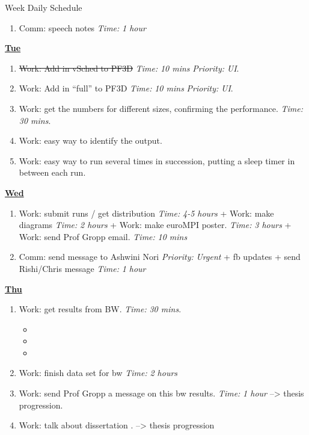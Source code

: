 \documentclass[serif, mathserif, final]{beamer}
\newcommand{\doneTask}[1]{\item \sout{#1}}
\newcommand{\timeEst}[1]{\textit{Time:} \textit{#1}}
\newcommand{\priority}[1]{\textit{Priority:} \textit{#1}}
\begin{document}
\begin{frame}{}
\begin{columns}
\begin{column}{0.50\linewidth}
\begin{block}{Week Daily Schedule}
\begin{enumerate}
\item \tiny Comm: speech notes \timeEst{1 hour} 
\end{enumerate} 

\textbf{\small \underline{Tue}}
\begin{enumerate} 
\tiny \doneTask{Work: Add in vSched to PF3D} \timeEst{10 mins} \priority{UI}.  
\item \tiny Work: Add in ``full'' to PF3D \timeEst{10 mins} \priority{UI}. 

\item \tiny Work: get the numbers for different sizes, confirming the performance. \timeEst{30 mins}.  
\item \tiny Work: easy way to identify the output. 
\item \tiny Work: easy way to run several times in succession, putting a sleep timer in between each run. 
\end{enumerate} 

\textbf{\small {\underline{Wed}}}
\begin{enumerate} 
\item \tiny Work: submit runs / get distribution \timeEst{4-5 hours}  + Work: make diagrams \timeEst{2 hours}   + Work: make euroMPI poster. \timeEst{3 hours} + Work: send Prof Gropp email. \timeEst{10 mins} 

\tiny \item \tiny Comm: send message to Ashwini Nori \priority{Urgent}  + fb updates + send Rishi/Chris message  \timeEst{1 hour} 
\end{enumerate} 

\textbf{\small{\underline{Thu}}}
\begin{enumerate} 

\item \tiny Work: get results from BW. \timeEst{30 mins}. 
\begin{itemize}
\item \tiny 
\item \tiny 
\item \tiny 
\end{itemize} 

\tiny \item \tiny Work: finish data set for bw \timeEst{2 hours}
\item \tiny Work:  send Prof Gropp a message on this bw results. \timeEst{1 hour}  --> thesis progression. 

\item \tiny Work: talk about dissertation . --> thesis progression 



\end{enumerate}
\end{block}
\end{column}
\end{columns}
\end{frame}
\end{document}
